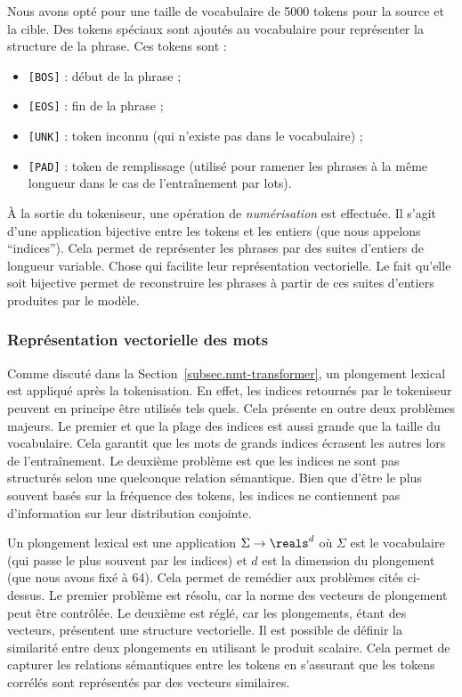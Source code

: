Nous avons opté pour une taille de vocabulaire de 5000 tokens pour la source et la cible.
Des tokens spéciaux sont ajoutés au vocabulaire pour représenter la structure de la phrase.
Ces tokens sont :
\begin{itemize}
    \item \texttt{[BOS]} : début de la phrase ;
    \item \texttt{[EOS]} : fin de la phrase ;
    \item \texttt{[UNK]} : token inconnu (qui n'existe pas dans le vocabulaire) ;
    \item \texttt{[PAD]} : token de remplissage (utilisé pour ramener les phrases à la même longueur 
    dans le cas de l'entraînement par lots).
\end{itemize}

À la sortie du tokeniseur, une opération de \emph{numérisation} est effectuée.
Il s'agit d'une application bijective entre les tokens et les entiers (que nous appelons ``indices'').
Cela permet de représenter les phrases par des suites d'entiers de longueur variable.
Chose qui facilite leur représentation vectorielle.
Le fait qu'elle soit bijective permet de reconstruire les phrases 
à partir de ces suites d'entiers produites par le modèle.

\subsubsection{Représentation vectorielle des mots}

Comme discuté dans la Section~\ref{subsec.nmt-transformer},
un plongement lexical est appliqué après la tokenisation.
En effet, les indices retournés par le tokeniseur peuvent en principe être utilisés tels quels.
Cela présente en outre deux problèmes majeurs.
Le premier et que la plage des indices est aussi grande que la taille du vocabulaire.
Cela garantit que les mots de grands indices écrasent les autres lors de l'entraînement.
Le deuxième problème est que les indices ne sont pas structurés selon une quelconque relation sémantique.
Bien que d'être le plus souvent basés sur la fréquence des tokens, 
les indices ne contiennent pas d'information sur leur distribution conjointe.

Un plongement lexical est une application \(\Sigma \to \reals^d\) où \(\Sigma\) est le vocabulaire 
(qui passe le plus souvent par les indices) et \(d\) est la dimension du plongement (que nous avons fixé à 64).
Cela permet de remédier aux problèmes cités ci-dessus.
Le premier problème est résolu, car la norme des vecteurs de plongement peut être contrôlée.
Le deuxième est réglé, car les plongements, étant des vecteurs, présentent une structure vectorielle.
Il est possible de définir la similarité entre deux plongements en utilisant le produit scalaire.
Cela permet de capturer les relations sémantiques entre les tokens en s'assurant que les tokens corrélés
sont représentés par des vecteurs similaires.

